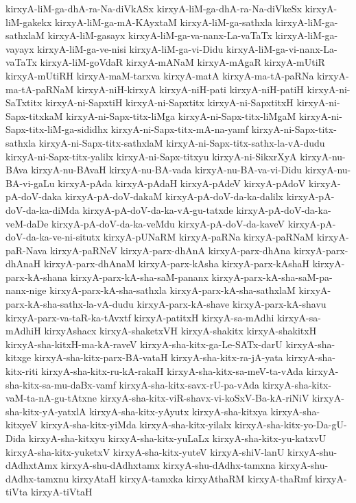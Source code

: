 {kirxyA-liM-ga-dhA-ra-Na-diVkASx
kirxyA-liM-ga-dhA-ra-Na-diVkeSx
kirxyA-liM-gakekx
kirxyA-liM-ga-mA-KAyxtaM
kirxyA-liM-ga-sathxla
kirxyA-liM-ga-sathxlaM
kirxyA-liM-gasayx
kirxyA-liM-ga-va-nanx-La-vaTaTx
kirxyA-liM-ga-vayayx
kirxyA-liM-ga-ve-nisi
kirxyA-liM-ga-vi-Didu
kirxyA-liM-ga-vi-nanx-La-vaTaTx
kirxyA-liM-goVdaR
kirxyA-mANaM
kirxyA-mAgaR
kirxyA-mUtiR
kirxyA-mUtiRH
kirxyA-maM-tarxva
kirxyA-matA
kirxyA-ma-tA-paRNa
kirxyA-ma-tA-paRNaM
kirxyA-niH-kirxyA
kirxyA-niH-pati
kirxyA-niH-patiH
kirxyA-ni-SaTxtitx
kirxyA-ni-SapxtiH
kirxyA-ni-Sapxtitx
kirxyA-ni-SapxtitxH
kirxyA-ni-Sapx-titxkaM
kirxyA-ni-Sapx-titx-liMga
kirxyA-ni-Sapx-titx-liMgaM
kirxyA-ni-Sapx-titx-liM-ga-sididhx
kirxyA-ni-Sapx-titx-mA-na-yamf
kirxyA-ni-Sapx-titx-sathxla
kirxyA-ni-Sapx-titx-sathxlaM
kirxyA-ni-Sapx-titx-sathx-la-vA-dudu
kirxyA-ni-Sapx-titx-yalilx
kirxyA-ni-Sapx-titxyu
kirxyA-ni-SikxrXyA
kirxyA-nu-BAva
kirxyA-nu-BAvaH
kirxyA-nu-BA-vada
kirxyA-nu-BA-va-vi-Didu
kirxyA-nu-BA-vi-gaLu
kirxyA-pAda
kirxyA-pAdaH
kirxyA-pAdeV
kirxyA-pAdoV
kirxyA-pA-doV-daka
kirxyA-pA-doV-dakaM
kirxyA-pA-doV-da-ka-dalilx
kirxyA-pA-doV-da-ka-diMda
kirxyA-pA-doV-da-ka-vA-gu-tatxde
kirxyA-pA-doV-da-ka-veM-daDe
kirxyA-pA-doV-da-ka-veMdu
kirxyA-pA-doV-da-kaveV
kirxyA-pA-doV-da-ka-ve-ni-situtx
kirxyA-pUNaRM
kirxyA-paRNa
kirxyA-paRNaM
kirxyA-paR-Nava
kirxyA-paRNeV
kirxyA-parx-dhAnA
kirxyA-parx-dhAna
kirxyA-parx-dhAnaH
kirxyA-parx-dhAnaM
kirxyA-parx-kAsha
kirxyA-parx-kAshaH
kirxyA-parx-kA-shana
kirxyA-parx-kA-sha-saM-pananx
kirxyA-parx-kA-sha-saM-pa-nanx-nige
kirxyA-parx-kA-sha-sathxla
kirxyA-parx-kA-sha-sathxlaM
kirxyA-parx-kA-sha-sathx-la-vA-dudu
kirxyA-parx-kA-shave
kirxyA-parx-kA-shavu
kirxyA-parx-va-taR-ka-tAvxtf
kirxyA-patitxH
kirxyA-sa-mAdhi
kirxyA-sa-mAdhiH
kirxyAshacx
kirxyA-shaketxVH
kirxyA-shakitx
kirxyA-shakitxH
kirxyA-sha-kitxH-ma-kA-raveV
kirxyA-sha-kitx-ga-Le-SATx-darU
kirxyA-sha-kitxge
kirxyA-sha-kitx-parx-BA-vataH
kirxyA-sha-kitx-ra-jA-yata
kirxyA-sha-kitx-riti
kirxyA-sha-kitx-ru-kA-rakaH
kirxyA-sha-kitx-sa-meV-ta-vAda
kirxyA-sha-kitx-sa-mu-daBx-vamf
kirxyA-sha-kitx-savx-rU-pa-vAda
kirxyA-sha-kitx-vaM-ta-nA-gu-tAtxne
kirxyA-sha-kitx-viR-shavx-vi-koSxV-Ba-kA-riNiV
kirxyA-sha-kitx-yA-yatxlA
kirxyA-sha-kitx-yAyutx
kirxyA-sha-kitxya
kirxyA-sha-kitxyeV
kirxyA-sha-kitx-yiMda
kirxyA-sha-kitx-yilalx
kirxyA-sha-kitx-yo-Da-gU-Dida
kirxyA-sha-kitxyu
kirxyA-sha-kitx-yuLaLx
kirxyA-sha-kitx-yu-katxvU
kirxyA-sha-kitx-yuketxV
kirxyA-sha-kitx-yuteV
kirxyA-shiV-lanU
kirxyA-shu-dAdhxtAmx
kirxyA-shu-dAdhxtamx
kirxyA-shu-dAdhx-tamxna
kirxyA-shu-dAdhx-tamxnu
kirxyAtaH
kirxyA-tamxka
kirxyAthaRM
kirxyA-thaRmf
kirxyA-tiVta
kirxyA-tiVtaH
}
